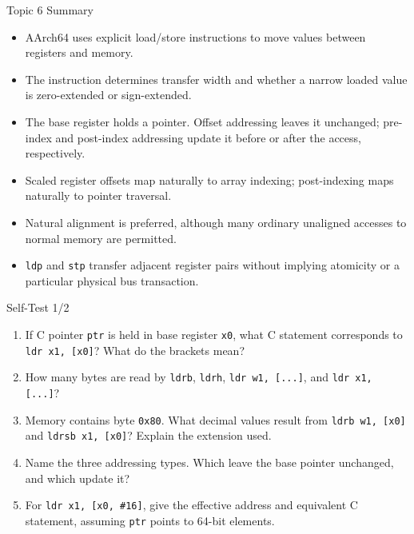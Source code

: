 \documentclass[aspectratio=169,11pt,t]{beamer}
\newcommand{\hex}[1]{\texttt{0x#1}}
\newcommand{\code}[1]{\texttt{#1}}
\begin{document}
\begin{frame}{Topic 6 Summary}
\begin{itemize}
\item AArch64 uses explicit load/store instructions to move values between registers and memory.
\item The instruction determines transfer width and whether a narrow loaded value is zero-extended or sign-extended.
\item The base register holds a pointer. Offset addressing leaves it unchanged; pre-index and post-index addressing update it before or after the access, respectively.
\item Scaled register offsets map naturally to array indexing; post-indexing maps naturally to pointer traversal.
\item Natural alignment is preferred, although many ordinary unaligned accesses to normal memory are permitted.
\item \code{ldp} and \code{stp} transfer adjacent register pairs without implying atomicity or a particular physical bus transaction.
\end{itemize}
\end{frame}




\begin{frame}{Self-Test 1/2}
\begin{enumerate}
\item If C pointer \code{ptr} is held in base register \code{x0}, what C statement corresponds to \code{ldr x1, [x0]}? What do the brackets mean?
\item How many bytes are read by \code{ldrb}, \code{ldrh}, \code{ldr w1, [...]}, and \code{ldr x1, [...]}?
\item Memory contains byte \hex{80}. What decimal values result from \code{ldrb w1, [x0]} and \code{ldrsb x1, [x0]}? Explain the extension used.
\item Name the three addressing types. Which leave the base pointer unchanged, and which update it?
\item For \code{ldr x1, [x0, \#16]}, give the effective address and equivalent C statement, assuming \code{ptr} points to 64-bit elements.
\end{enumerate}
\end{frame}
\end{document}
